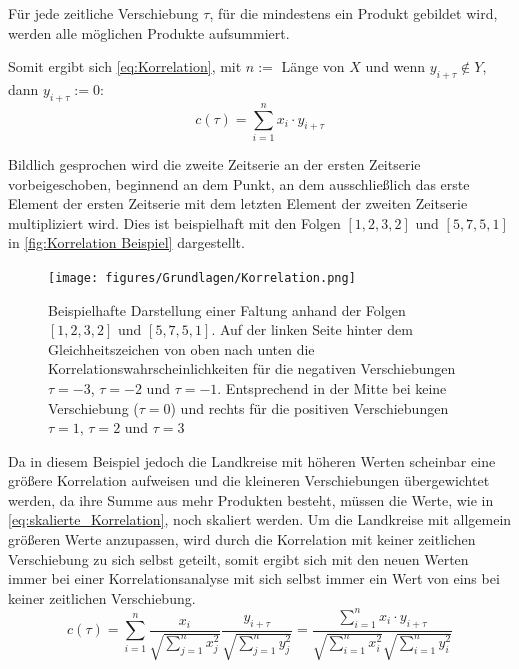 Für jede zeitliche Verschiebung $\tau$, für die mindestens ein Produkt gebildet wird, werden alle möglichen Produkte aufsummiert.

Somit ergibt sich \autoref{eq:Korrelation}, mit $n := $ Länge von $X$ und wenn $y_{i+\tau} \not\in Y$, dann $y_{i+\tau} := 0$:
\begin{equation}\label{eq:Korrelation}
    c(\tau) = \sum_{i=1}^n x_i\cdot y_{i+\tau}
\end{equation}


Bildlich gesprochen wird die zweite Zeitserie an der ersten Zeitserie vorbeigeschoben, beginnend an dem Punkt, an dem ausschließlich das erste Element der ersten Zeitserie mit dem letzten Element der zweiten Zeitserie multipliziert wird. Dies ist beispielhaft mit den Folgen $[1,2,3,2]$ und $[5,7,5,1]$ in \autoref{fig:Korrelation Beispiel} dargestellt.

\begin{figure}[H]
    \centering
    \texttt{[image: figures/Grundlagen/Korrelation.png]}
    \caption{Beispielhafte Darstellung einer Faltung anhand der Folgen $[1,2,3,2]$ und $[5,7,5,1]$. Auf der linken Seite hinter dem Gleichheitszeichen von oben nach unten die Korrelationswahrscheinlichkeiten für die negativen Verschiebungen $\tau=-3$, $\tau=-2$ und $\tau=-1$. Entsprechend in der Mitte bei keine Verschiebung ($\tau=0$) und rechts für die positiven Verschiebungen $\tau=1$, $\tau=2$ und $\tau=3$}
    \label{fig:Korrelation Beispiel}
\end{figure}

Da in diesem Beispiel jedoch die Landkreise mit höheren Werten scheinbar eine größere Korrelation aufweisen und die kleineren Verschiebungen übergewichtet werden, da ihre Summe aus mehr Produkten besteht, müssen die Werte, wie in \autoref{eq:skalierte_Korrelation}, noch skaliert werden.
Um die Landkreise mit allgemein größeren Werte anzupassen, wird durch die Korrelation mit keiner zeitlichen Verschiebung zu sich selbst
geteilt, somit ergibt sich mit den neuen Werten immer bei einer Korrelationsanalyse mit sich selbst immer ein Wert von eins bei keiner zeitlichen Verschiebung.
\begin{equation}\label{eq:skalierte_Korrelation}
    c(\tau) =\sum_{i=1}^n \frac{x_i}{\sqrt{\sum_{j=1}^n x_j^2}}
    \frac{y_{i+\tau}}{\sqrt{\sum_{j=1}^n y_j^2}}= 
    \frac{\sum_{i=1}^n x_i\cdot y_{i+\tau}}{\sqrt{\sum_{i=1}^n x_i^2}\sqrt{\sum_{i=1}^n y_i^2}}
\end{equation}


